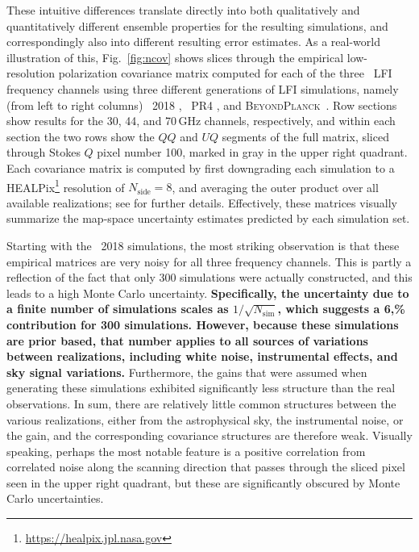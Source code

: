\documentclass[twocolumn]{aa}%
\newcommand{\BP}{\textsc{BeyondPlanck}}
\begin{document}
These intuitive differences translate directly into both qualitatively
and quantitatively different ensemble properties for the resulting
simulations, and correspondingly also into different resulting error
estimates. As a real-world illustration of this, Fig.~\ref{fig:ncov}
shows slices through the empirical low-resolution polarization
covariance matrix computed for each of the three \Planck\ LFI
frequency channels using three different generations of LFI
simulations, namely (from left to right columns) \Planck\ 2018
\citep{planck2016-l02}, \Planck\ PR4 \citep{planck2020-LVII}, and
\BP\ \citep{bp01}. Row sections show results for the 30, 44, and
70\,GHz channels, respectively, and within each section the two rows
show the $QQ$ and $UQ$ segments of the full matrix, sliced through
Stokes $Q$ pixel number 100, marked in gray in the upper right
quadrant. Each covariance matrix is computed by first downgrading each
simulation to a HEALPix\footnote{\url{https://healpix.jpl.nasa.gov}}
\citep{gorski2005} resolution of $N_{\mathrm{side}}=8$, and averaging
the outer product over all available realizations; see
\citet{bp10,bp11} for further details. Effectively, these matrices
visually summarize the map-space uncertainty estimates predicted by
each simulation set.


Starting with the \Planck\ 2018 simulations, the most striking
observation is that these empirical matrices are very noisy for all
three frequency channels. This is partly a reflection of the fact that
only 300 simulations were actually constructed, and this leads to a
high Monte Carlo uncertainty. {\bf Specifically, the uncertainty due
  to a finite number of simulations scales as
  $1/\sqrt{N_{\mathrm{sim}}}$, which suggests a 6,\% contribution for
  300 simulations. However, because these simulations are prior based,
  that number applies to all sources of variations between
  realizations, including white noise, instrumental effects, and sky
  signal variations.} Furthermore, the gains that were assumed when
generating these simulations exhibited significantly less structure
than the real observations. In sum, there are relatively little common
structures between the various realizations, either from the
astrophysical sky, the instrumental noise, or the gain, and the
corresponding covariance structures are therefore weak. Visually
speaking, perhaps the most notable feature is a positive correlation
from correlated noise along the scanning direction that passes through
the sliced pixel seen in the upper right quadrant, but these are
significantly obscured by Monte Carlo uncertainties.
\end{document}

